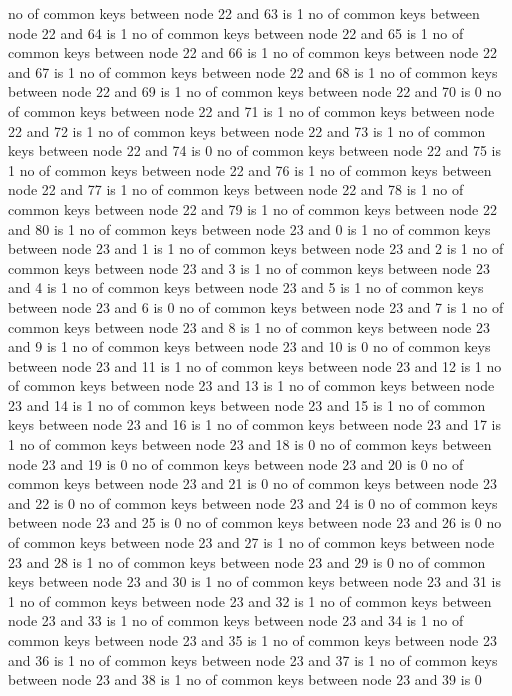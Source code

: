 no of common keys between node 22 and 63 is 1
no of common keys between node 22 and 64 is 1
no of common keys between node 22 and 65 is 1
no of common keys between node 22 and 66 is 1
no of common keys between node 22 and 67 is 1
no of common keys between node 22 and 68 is 1
no of common keys between node 22 and 69 is 1
no of common keys between node 22 and 70 is 0
no of common keys between node 22 and 71 is 1
no of common keys between node 22 and 72 is 1
no of common keys between node 22 and 73 is 1
no of common keys between node 22 and 74 is 0
no of common keys between node 22 and 75 is 1
no of common keys between node 22 and 76 is 1
no of common keys between node 22 and 77 is 1
no of common keys between node 22 and 78 is 1
no of common keys between node 22 and 79 is 1
no of common keys between node 22 and 80 is 1
no of common keys between node 23 and 0 is 1
no of common keys between node 23 and 1 is 1
no of common keys between node 23 and 2 is 1
no of common keys between node 23 and 3 is 1
no of common keys between node 23 and 4 is 1
no of common keys between node 23 and 5 is 1
no of common keys between node 23 and 6 is 0
no of common keys between node 23 and 7 is 1
no of common keys between node 23 and 8 is 1
no of common keys between node 23 and 9 is 1
no of common keys between node 23 and 10 is 0
no of common keys between node 23 and 11 is 1
no of common keys between node 23 and 12 is 1
no of common keys between node 23 and 13 is 1
no of common keys between node 23 and 14 is 1
no of common keys between node 23 and 15 is 1
no of common keys between node 23 and 16 is 1
no of common keys between node 23 and 17 is 1
no of common keys between node 23 and 18 is 0
no of common keys between node 23 and 19 is 0
no of common keys between node 23 and 20 is 0
no of common keys between node 23 and 21 is 0
no of common keys between node 23 and 22 is 0
no of common keys between node 23 and 24 is 0
no of common keys between node 23 and 25 is 0
no of common keys between node 23 and 26 is 0
no of common keys between node 23 and 27 is 1
no of common keys between node 23 and 28 is 1
no of common keys between node 23 and 29 is 0
no of common keys between node 23 and 30 is 1
no of common keys between node 23 and 31 is 1
no of common keys between node 23 and 32 is 1
no of common keys between node 23 and 33 is 1
no of common keys between node 23 and 34 is 1
no of common keys between node 23 and 35 is 1
no of common keys between node 23 and 36 is 1
no of common keys between node 23 and 37 is 1
no of common keys between node 23 and 38 is 1
no of common keys between node 23 and 39 is 0
